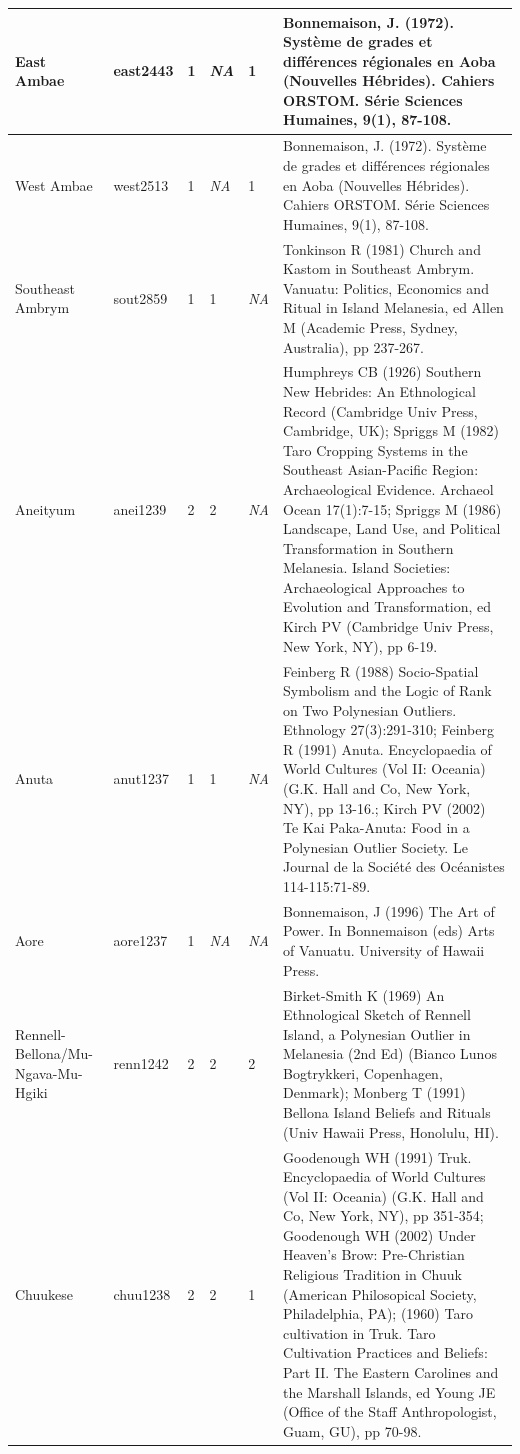 \documentclass[draft,10pt]{article} %
\begin{document}
\begin{landscape}
\begin{longtable}{ | p{2cm}| p{2cm}| p{1.8cm}| p{1.8cm}| p{3cm}| p{9cm}| }
\hline
East Ambae&east2443&1&\emph{NA}&1&Bonnemaison, J. (1972). Système de grades et diff\'{e}rences r\'{e}gionales en Aoba (Nouvelles H\'{e}brides). Cahiers ORSTOM. S\'{e}rie Sciences Humaines, 9(1), 87-108.\\ \hline
West Ambae&west2513&1&\emph{NA}&1&Bonnemaison, J. (1972). Système de grades et diff\'{e}rences r\'{e}gionales en Aoba (Nouvelles H\'{e}brides). Cahiers ORSTOM. S\'{e}rie Sciences Humaines, 9(1), 87-108.\\ \hline
Southeast Ambrym&sout2859&1&1&\emph{NA}&Tonkinson R (1981) Church and Kastom in Southeast Ambrym. Vanuatu: Politics, Economics and Ritual in Island Melanesia, ed Allen M (Academic Press, Sydney, Australia), pp 237-267.\\ \hline
Aneityum&anei1239&2&2&\emph{NA}&Humphreys CB (1926) Southern New Hebrides: An Ethnological Record (Cambridge Univ Press, Cambridge, UK); Spriggs M (1982) Taro Cropping Systems in the Southeast Asian-Pacific Region: Archaeological Evidence. Archaeol Ocean 17(1):7-15; Spriggs M (1986) Landscape, Land Use, and Political Transformation in Southern Melanesia. Island Societies: Archaeological Approaches to Evolution and Transformation, ed Kirch PV (Cambridge Univ Press, New York, NY), pp 6-19. \\ \hline
Anuta&anut1237&1&1&\emph{NA}&Feinberg R (1988) Socio-Spatial Symbolism and the Logic of Rank on Two Polynesian Outliers. Ethnology 27(3):291-310; Feinberg R (1991) Anuta. Encyclopaedia of World Cultures (Vol II: Oceania) (G.K. Hall and Co, New York, NY), pp 13-16.; Kirch PV (2002) Te Kai Paka-Anuta: Food in a Polynesian Outlier Society. Le Journal de la Soci\'{e}t\'{e} des Oc\'{e}anistes 114-115:71-89. \\ \hline
Aore&aore1237&1&\emph{NA}&\emph{NA}&Bonnemaison, J (1996) The Art of Power. In Bonnemaison (eds) Arts of Vanuatu. University of Hawaii Press.\\ \hline
Rennell-Bellona/Mu-Ngava-Mu-Hgiki&renn1242&2&2&2&Birket-Smith K (1969) An Ethnological Sketch of Rennell Island, a Polynesian Outlier in Melanesia (2nd Ed) (Bianco Lunos Bogtrykkeri, Copenhagen, Denmark); Monberg T (1991) Bellona Island Beliefs and Rituals (Univ Hawaii Press, Honolulu, HI). \\ \hline
Chuukese&chuu1238&2&2&1&Goodenough WH (1991) Truk. Encyclopaedia of World Cultures (Vol II: Oceania) (G.K. Hall and Co, New York, NY), pp 351-354; Goodenough WH (2002) Under Heaven's Brow: Pre-Christian Religious Tradition in Chuuk (American Philosopical Society, Philadelphia, PA); (1960) Taro cultivation in Truk. Taro Cultivation Practices and Beliefs: Part II. The Eastern Carolines and the Marshall Islands, ed Young JE (Office of the Staff Anthropologist, Guam, GU), pp 70-98. \\ \hline

\end{longtable}
\end{landscape}
\end{document}
